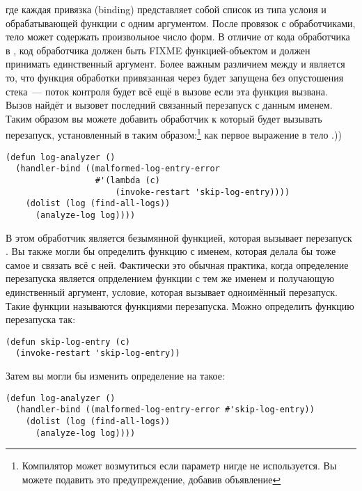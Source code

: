 где каждая привязка (binding) представляет собой список из типа услоия и обрабатывающей
функции с одним аргументом. После провязок с обработчиками, тело  может
содержать произвольное число форм. В отличие от кода обработчика в ,
код обработчика должен быть FIXME функцией-объектом и должен принимать единственный
аргумент. Более важным различием между  и  является
то, что функция обработки привязанная через  будет запущена без
опустошения стека~--- поток контроля будет всё ещё в вызове  если
эта функция вызвана. Вызов  найдёт и вызовет последний связанный
перезапуск с данным именем. Таким образом вы можете добавить обработчик к
 который будет вызывать  перезапуск, установленный
в  таким образом:\footnote{Компилятор может возмутиться если параметр
    нигде не используется. Вы можете подавить это предупреждение, добавив объявление
    } как первое выражение в тело .))

\begin{lstlisting}
(defun log-analyzer ()
  (handler-bind ((malformed-log-entry-error
                  #'(lambda (c)
                      (invoke-restart 'skip-log-entry))))
    (dolist (log (find-all-logs))
      (analyze-log log))))
\end{lstlisting}

В этом  обработчик является безымянной функцией, которая вызывает
перезапуск . Вы также могли бы определить функцию с именем, которая
делала бы тоже самое и связать всё с ней. Фактически это обычная практика, когда
определение перезапуска является опрделением функции с тем же именем и получающую
единственный аргумент, условие, которая вызывает одноимённый перезапуск. Такие функции
называются функциями перезапуска. Можно определить функцию перезапуска
 так:

\begin{lstlisting}
(defun skip-log-entry (c)
  (invoke-restart 'skip-log-entry))
\end{lstlisting}

Затем вы могли бы изменить определение  на такое:

\begin{lstlisting}
(defun log-analyzer ()
  (handler-bind ((malformed-log-entry-error #'skip-log-entry))
    (dolist (log (find-all-logs))
      (analyze-log log))))
\end{lstlisting}

